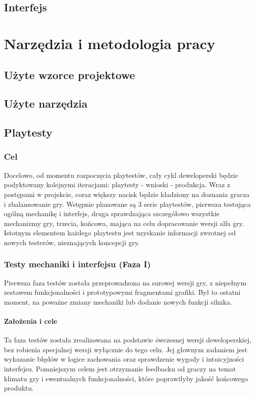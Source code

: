 \documentclass[licencjacka]{pracamgr}
\begin{document}
  \section{Interfejs}

\chapter{Narzędzia i metodologia pracy}

  \section{Użyte wzorce projektowe}

  \section{Użyte narzędzia}

  \section{Playtesty}
  \subsection{Cel}
  Docelowo, od momentu rozpoczęcia playtestów, cały cykl deweloperski będzie podyktowany 
  kolejnymi iteracjami: playtesty - wnioski - produkcja. Wraz z postępami w projekcie, 
  coraz większy nacisk będzie kładziony na doznania gracza i zbalansowanie gry. 
  Wstępnie planowane są 3 serie playtestów, pierwsza testująca ogólną mechanikę i interfejs,
  druga sprawdzająca szczegółowo wszystkie mechanizmy gry, trzecia, końcowa, mająca na celu dopracowanie wersji alfa gry.
  Istotnym elementem każdego playtestu jest uzyskanie informacji zwrotnej od nowych testerów, nieznających koncepcji gry.
    
    \subsection{Testy mechaniki i interfejsu (Faza I)}
    Pierwsza faza testów została przeprowadzona na surowej wersji gry, 
    z niepełnym zestawem funkcjonalności i prototypowymi fragmentami grafiki. 
    Był to ostatni moment, na poważne zmiany mechaniki lub dodanie nowych funkcji silnika.
      
      \subsubsection{Założenia i cele}
      Ta faza testów została zrealizowana na podstawie ówczesnej wersji deweloperskiej, 
      bez robienia specjalnej wersji wyłącznie do tego celu. Jej głownym zadaniem jest 
      wykazanie błędów w logice zachowania oraz sprawdzenie wygody i intuicyjności interfejsu. 
      Pomniejszym celem jest otrzymanie feedbacku od graczy na temat klimatu gry
      i ewentualnych funkcjonalności, które poprawiłyby jakość końcowego produktu.
      
\end{document}
